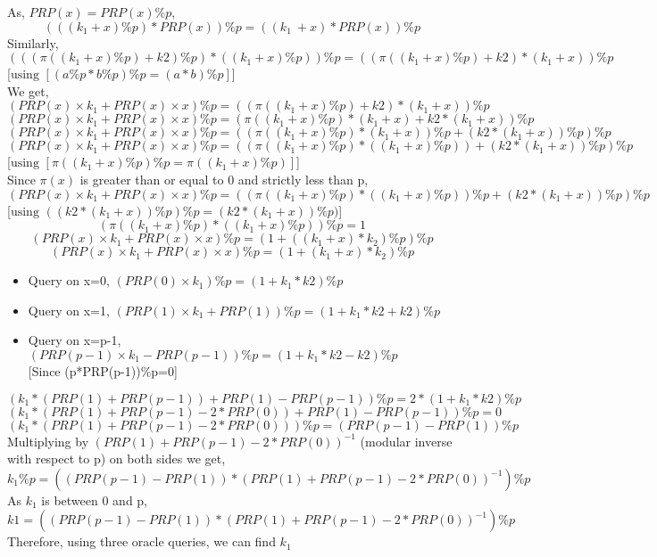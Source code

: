 \documentclass{article}
\begin{document}

As, $PRP(x) = PRP(x)\% p$,
\[(((k_1+x)\% p) * PRP(x))\% p = ((k_1\ +x)*PRP(x))\%p\] 
Similarly, \[(((\pi((k_1+x)\% p)+k2)\% p) *((k_1+x)\% p))\% p = ((\pi((k_1+x)\% p)+k2)* (k_1+x))\% p \]
\hfill[$\text{using }[(a\%p*b\%p)\% p = (a*b) \% p]$]\\
We get,
\[(PRP(x) \times k_1+PRP(x) \times x) \% p = ((\pi((k_1+x)\% p)+k2)* (k_1+x))\% p\] 
\[(PRP(x) \times k_1+PRP(x) \times x) \% p = (\pi((k_1+x)\% p)* (k_1+x)+k2* (k_1+x))\% p\] 
\[(PRP(x) \times k_1+PRP(x) \times x) \% p = ((\pi((k_1+x)\% p)* (k_1+x))\% p+(k2* (k_1+x))\% p)\% p\]
\[(PRP(x) \times k_1+PRP(x) \times x) \% p = ((\pi((k_1+x)\% p)* ((k_1+x)\% p))+(k2* (k_1+x))\% p)\% p \]
\hfill[$\text{using }[\pi((k_1+x)\% p)\%p = \pi((k_1+x)\% p)]$]
\\
Since $\pi(x)$ is  greater than or equal to 0 and strictly less than p,
\[(PRP(x) \times k_1+PRP(x) \times x) \% p = ((\pi((k_1+x)\% p)* ((k_1+x)\% p))\% p+(k2* (k_1+x))\% p)\% p\] 
\hfill[$\text{using }((k2*(k_1+x))\% p)\%p = (k2*(k_1+x))\% p)$] 
\[(\pi((k_1+x)\% p)* ((k_1+x)\% p))\% p =1\]
\[(PRP(x) \times k_1+PRP(x) \times x) \% p = 
(1+((k_1+x)*k_2)\%p)\%p\]
\[(PRP(x) \times k_1+PRP(x) \times x) \% p = 
(1+(k_1+x)*k_2)\%p\]
\begin{itemize}
    \item Query on x=0, $(PRP(0) \times k_1) \% p = (1+k_1*k2)\% p$ 
    \item Query on x=1, $(PRP(1) \times k_1 + PRP(1)) \% p = (1+k_1*k2+k2)\% p$ 
    \item Query on x=p-1, $(PRP(p-1) \times k_1 -PRP(p-1)) \% p = (1+k_1*k2-k2)\% p$ \\
\hfill[Since (p*PRP(p-1))\%p=0]
\end{itemize}
\[(k_1*(PRP(1)+PRP(p-1))+PRP(1)-PRP(p-1))\%p=2*(1+k_1*k2)\%p\]
\[(k_1*(PRP(1)+PRP(p-1)-2*PRP(0))+PRP(1)-PRP(p-1))\%p=0\]
\[(k_1*(PRP(1)+PRP(p-1)-2*PRP(0)))\%p=(PRP(p-1)-PRP(1))\%p\]
Multiplying by $(PRP(1)+PRP(p-1)-2*PRP(0))^{-1}$ (modular inverse with respect to p) on both sides we get,
\[k_1\%p=((PRP(p-1)-PRP(1))*(PRP(1)+PRP(p-1)-2*PRP(0))^{-1})\%p\]
As $k_1$ is between 0 and p,
\[k1=((PRP(p-1)-PRP(1))*(PRP(1)+PRP(p-1)-2*PRP(0))^{-1})\%p\]
Therefore, using three oracle queries, we can find $k_1$
\end{document}
